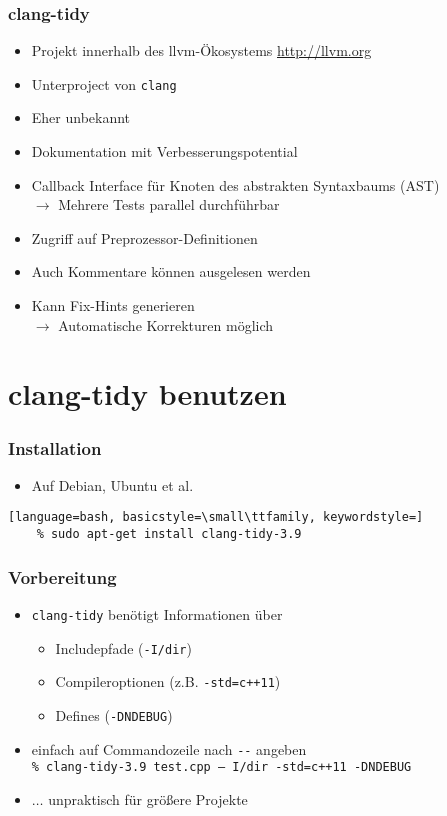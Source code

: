 \documentclass[aspectratio=169]{beamer}
\begin{document}
\begin{frame}
  \frametitle{clang-tidy}
  \begin{itemize}
  \item Projekt innerhalb des llvm-Ökosystems \quad \url{http://llvm.org}
    \pause
  \item Unterproject von \texttt{clang}
    \pause
  \item Eher unbekannt
    \pause
  \item Dokumentation mit Verbesserungspotential
    \pause
  \item Callback Interface für Knoten des abstrakten Syntaxbaums (AST)
    \pause \\
    \qquad $\rightarrow$ Mehrere Tests parallel durchführbar
    \pause
  \item Zugriff auf Preprozessor-Definitionen
    \pause
  \item Auch Kommentare können ausgelesen werden
    \pause
  \item Kann Fix-Hints generieren 
    \pause \\
  \qquad $\rightarrow$ Automatische Korrekturen möglich    
  \end{itemize}
\end{frame}
\section{clang-tidy benutzen}
\begin{frame}[fragile]
  \frametitle{Installation}
  \begin{itemize}
    \item Auf Debian, Ubuntu et al.
  \end{itemize}
  \begin{lstlisting}[language=bash, basicstyle=\small\ttfamily, keywordstyle=]
    % sudo apt-get install clang-tidy-3.9
  \end{lstlisting}
\end{frame}

\begin{frame}
  \frametitle{Vorbereitung}
  \begin{itemize}
  \item \texttt{clang-tidy} benötigt Informationen über \pause
    \begin{itemize}
    \item Includepfade (\texttt{-I/dir})
      \pause
    \item Compileroptionen (z.B. \texttt{-std=c++11})
      \pause
    \item Defines (\texttt{-DNDEBUG})
    \end{itemize}
    \pause
  \item einfach auf Commandozeile nach \texttt{-{}-} angeben\\
    \qquad \texttt{\% clang-tidy-3.9 test.cpp -- I/dir -std=c++11 -DNDEBUG}
  \item $\ldots{}$ unpraktisch für größere Projekte
  \end{itemize}
\end{frame}
\end{document}

